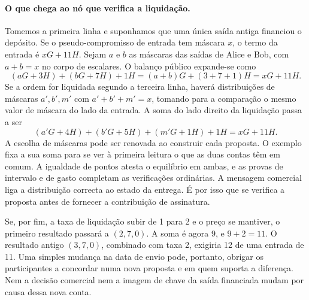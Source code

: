 \paragraph{O que chega ao nó que verifica a liquidação.}
Tomemos a primeira linha e suponhamos que uma única saída antiga
financiou o depósito. Se o pseudo-compromisso de entrada tem máscara
\(x\), o termo da entrada é \(xG+11H\). Sejam \(a\) e \(b\) as
máscaras das saídas de Alice e Bob, com \(a+b=x\) no corpo de
escalares. O balanço público expande-se como
\[
 (aG+3H)+(bG+7H)+1H=(a+b)G+(3+7+1)H=xG+11H.
\]
Se a ordem for liquidada segundo a terceira linha, haverá distribuições
de máscaras \(a',b',m'\) com \(a'+b'+m'=x\), tomando para a comparação
o mesmo valor de máscara do lado da entrada. A soma do lado direito da
liquidação passa a ser
\[
 (a'G+4H)+(b'G+5H)+(m'G+1H)+1H=xG+11H.
\]
A escolha de máscaras pode ser renovada ao construir cada proposta.
O exemplo fixa a sua soma para se ver à primeira leitura o que as duas
contas têm em comum. A igualdade de pontos atesta o equilíbrio em ambas,
e as provas de intervalo e de gasto completam as verificações ordinárias.
A mensagem comercial liga a distribuição correcta ao estado da entrega.
É por isso que se verifica a proposta antes de fornecer a contribuição
de assinatura.

Se, por fim, a taxa de liquidação subir de 1 para 2 e o preço se
mantiver, o primeiro resultado passará a \((2,7,0)\). A soma é agora 9,
e \(9+2=11\). O resultado antigo \((3,7,0)\), combinado com taxa 2,
exigiria 12 de uma entrada de 11. Uma simples mudança na data de envio
pode, portanto, obrigar os participantes a concordar numa nova proposta
e em quem suporta a diferença. Nem a decisão comercial nem a imagem
de chave da saída financiada mudam por causa dessa nova conta.
